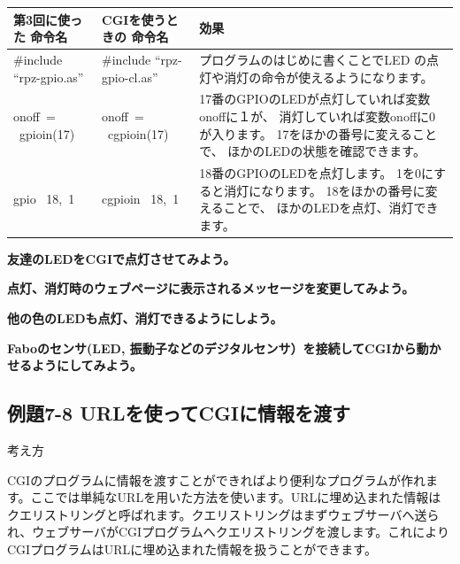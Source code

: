 \documentclass[a4paper,12pt,dvipdfmx]{jarticle}
\begin{document}
\begin{flushleft}
\tablefirsthead{}
\tablehead{}
\tabletail{}
\tablelasttail{}
\begin{supertabular}{|m{5.0cm}|m{5.5cm}|m{7.0cm}|}
\hline
第3回に使った
命令名 &
CGIを使うときの
命令名&
効果
\\\hline

\#include “rpz-gpio.as”&
\#include “rpz-gpio-cl.as”&
プログラムのはじめに書くことでLED
の点灯や消灯の命令が使えるようになります。
\\\hline

onoff\ = \ gpioin(17)&

onoff\ = \ cgpioin(17)&
17番のGPIOのLEDが点灯していれば変数onoffに１が、
消灯していれば変数onoffに0が入ります。
17をほかの番号に変えることで、
ほかのLEDの状態を確認できます。
\\\hline

gpio \ 18,\ 1&
cgpioin \ 18,\ 1&
18番のGPIOのLEDを点灯します。
1を0にすると消灯になります。
18をほかの番号に変えることで、
ほかのLEDを点灯、消灯できます。
\\\hline



\end{supertabular}
\end{flushleft}






\bigskip



{\bfseries
友達のLEDをCGIで点灯させてみよう。}

{\bfseries
点灯、消灯時のウェブページに表示されるメッセージを変更してみよう。}

{\bfseries
他の色のLEDも点灯、消灯できるようにしよう。}

{\bfseries
Faboのセンサ(LED,
振動子などのデジタルセンサ）を接続してCGIから動かせるようにしてみよう。}


\bigskip

\clearpage\subsection*{\rmfamily 例題7-8
URLを使ってCGIに情報を渡す}
考え方

CGIのプログラムに情報を渡すことができればより便利なプログラムが作れます。ここでは単純なURLを用いた方法を使います。URLに埋め込まれた情報はクエリストリングと呼ばれます。クエリストリングはまずウェブサーバへ送られ、ウェブサーバがCGIプログラムへクエリストリングを渡します。これによりCGIプログラムはURLに埋め込まれた情報を扱うことができます。
\end{document}
